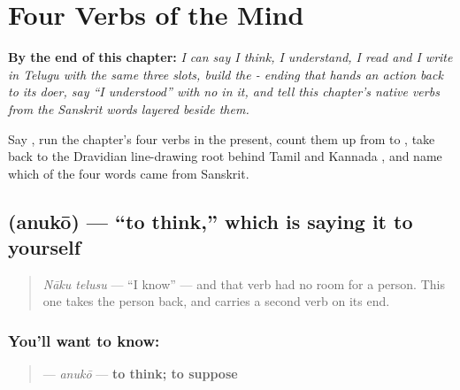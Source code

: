
\chapter{Four Verbs of the Mind}
\label{ch:te-verbs-of-the-mind}

\begin{chapteropening}
\textbf{By the end of this chapter:} \emph{I can say I think, I understand, I read and I write in Telugu with the same three slots, build the - ending that hands an action back to its doer, say \textquotedblleft{}I understood\textquotedblright{} with no  in it, and tell this chapter's native verbs from the Sanskrit words layered beside them.}

Say   , run the chapter's four verbs in the present, count them up from  to , take  back to the Dravidian line-drawing root behind Tamil  and Kannada , and name which of the four words came from Sanskrit.
\end{chapteropening}

\section[\texorpdfstring{\te{అనుకో} (anukō)}{అనుకో (anukō)}]{ (anukō) — \textquotedblleft{}to think,\textquotedblright{} which is saying it to yourself}

\label{lesson:TE-C33-anuko}



\begin{quote}
\emph{Nāku telusu} — \textquotedblleft{}I know\textquotedblright{} — and that verb had no room for a person. This one takes the person back, and carries a second verb on its end.
\end{quote}

\subsection*{You'll want to know: }
\begin{quote}
\textbf{} — \emph{anukō} — \textbf{to think; to suppose}
\end{quote}


